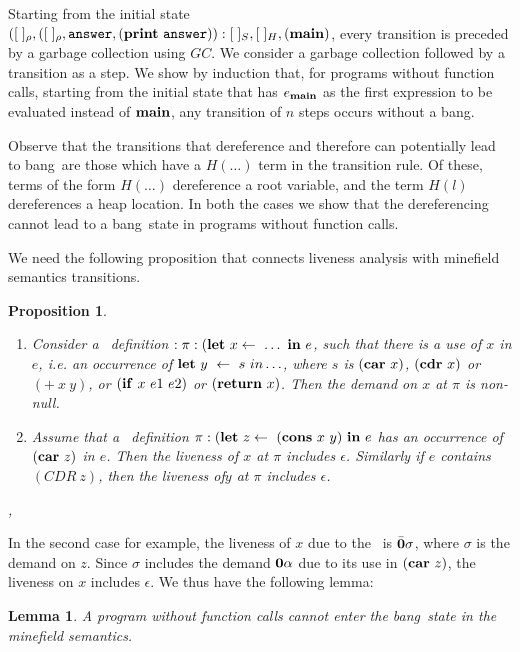 \documentclass[9pt]{sigplanconf}
\newcommand{\bang}{\mbox{\sc bang}}
\newtheorem{proposition}[theorem]{Proposition}
\newtheorem{lemma}[theorem]{Lemma}
\begin{document}
Starting   from  the   initial  state   $([\;]_\rho,([\;]_\rho,  \mathbf{\mbox{\tt answer}},
(\mathbf{print}~\mathbf{\mbox{\tt answer}})):[\;]_{S} ,  [\;]_{H}, (\mathbf{main})$, every  transition is
preceded by  a garbage collection  using $GC$.  We consider  a garbage
collection followed  by a transition as  a step. We show  by induction
that, for programs  without function calls, starting  from the initial
state that  has $e_{\mathbf{main}}$  as the first  expression to  be evaluated
instead  of $\mathbf{main}$,  any transition  of  $n$ steps  occurs without  a
\bang.

Observe  that  the  transitions  that dereference  and  therefore  can
potentially lead to \bang\ are those  which have a $H(\ldots)$ term in
the  transition  rule.   Of  these,  terms  of  the  form  $H(\ldots)$
dereference a root  variable, and the term $H(l)$  dereferences a heap
location.  In  both the  cases we show  that the  dereferencing cannot
lead to a \bang\ state in programs without function calls.

We  need the  following proposition that  connects  liveness analysis  with
minefield semantics transitions. 
\begin{proposition}
\label{prop:correctness}
\begin{enumerate} 
\item Consider a \LET\ definition \linebreak $:\pi: (\mbox{$\mathbf{ let}$}~x
  \leftarrow~\ldots~\mbox{$\mathbf{ in}$}~e$, such that there is a use of $x$
  in $e$, i.e.  an occurrence of $\mbox{$\mathbf{ let}$}~y~\leftarrow~s~in
  \ldots$, where $s$ is $(\mbox{$\mathbf{car}$}\ x)$, $(\mbox{$\mathbf{cdr}$}\ x)$ or $(+\ x\ y)$, or
  $(\mbox{$\mathbf{ if}$}\ x\ e1\ e2)$ or $(\mbox{$\mathbf{ return}$}\ x)$. Then the demand on $x$ at $\pi$ is non-null. 
\item Assume that a  \LET\ definition $\pi: (\mbox{$\mathbf{ let}$}~z  \leftarrow~(\mbox{$\mathbf{cons}$}~x~y)~\mbox{$\mathbf{ in}$}~e$ has an occurrence of 
 $(\mbox{$\mathbf{car}$}~z)$ in $e$. Then the liveness of $x$ at $\pi$ includes $\epsilon$.  Similarly if $e$ contains $(CDR~z)$, then the liveness of$y$ at $\pi$ includes $\epsilon$.  
\end{enumerate},
\end{proposition} 

In  the second  case for  example,  the liveness  of $x$  due to  the
\CONS\ is  $\bar{\mathbf{0}}\sigma$, where $\sigma$  is the demand on  $z$. Since
$\sigma$  includes  the  demand  $\mathbf{0}\alpha$   due  to  its  use  in
$(\mbox{$\mathbf{car}$}~z)$, the liveness on $x$  includes $\epsilon$. We thus have the
following lemma:

\begin{lemma}\label{lemma:no-calls-correctness} A program without function calls cannot enter the \bang\ state in the minefield semantics.
\end{lemma}
\end{document}

